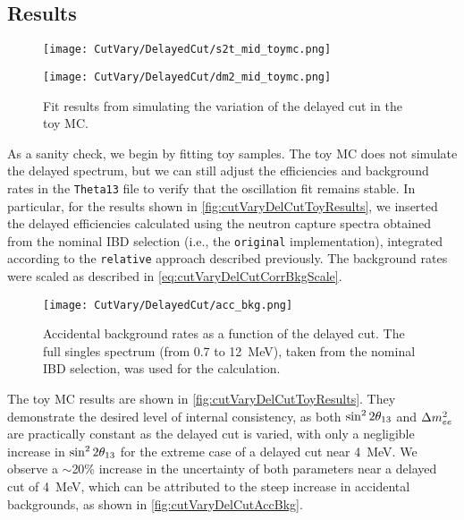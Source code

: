 \documentclass[../thesis.tex]{subfiles}
\begin{document}
\subsection{Results}
\label{sec:cutVaryDelCutResults}

\begin{figure}[ht]
  \begin{minipage}{0.5\linewidth}%
    \texttt{[image: CutVary/DelayedCut/s2t\_mid\_toymc.png]}%
  \end{minipage}%
  \begin{minipage}{0.5\linewidth}%
    \texttt{[image: CutVary/DelayedCut/dm2\_mid\_toymc.png]}%
  \end{minipage}%
  \caption{Fit results from simulating the variation of the delayed cut in the toy MC.}
  \label{fig:cutVaryDelCutToyResults}
\end{figure}

As a sanity check, we begin by fitting toy samples. The toy MC does not simulate the delayed spectrum, but we can still adjust the efficiencies and background rates in the \texttt{Theta13} file to verify that the oscillation fit remains stable. In particular, for the results shown in \autoref{fig:cutVaryDelCutToyResults}, we inserted the delayed efficiencies calculated using the neutron capture spectra obtained from the nominal IBD selection (i.e., the \texttt{original} implementation), integrated according to the \texttt{relative} approach described previously.
The background rates were scaled as described in \autoref{eq:cutVaryDelCutCorrBkgScale}.

\begin{figure}[ht]
  \texttt{[image: CutVary/DelayedCut/acc\_bkg.png]}
  \caption{Accidental background rates as a function of the delayed cut. The full singles spectrum (from 0.7 to 12~MeV), taken from the nominal IBD selection, was used for the calculation.}
  \label{fig:cutVaryDelCutAccBkg}
\end{figure}

The toy MC results are shown in \autoref{fig:cutVaryDelCutToyResults}. They demonstrate the desired level of internal consistency, as both $\sin^2 2\theta_{13}$ and $\Delta m^2_{ee}$ are practically constant as the delayed cut is varied, with only a negligible increase in $\sin^2 2\theta_{13}$ for the extreme case of a delayed cut near 4~MeV. We observe a $\sim$20\% increase in the uncertainty of both parameters near a delayed cut of 4~MeV, which can be attributed to the steep increase in accidental backgrounds, as shown in \autoref{fig:cutVaryDelCutAccBkg}.
\end{document}
